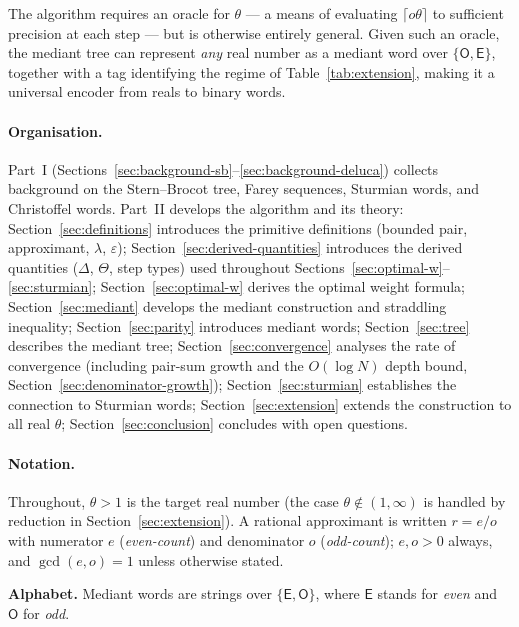 \documentclass[12pt]{article}
\theoremstyle{definition}
\theoremstyle{remark}
\theoremstyle{plain}
\newcommand{\OO}{\mathsf{O}}
\newcommand{\EE}{\mathsf{E}}
\begin{document}
The algorithm requires an oracle for $\theta$ --- a means of evaluating
$\lceil o\theta \rceil$ to sufficient precision at each step --- but is otherwise entirely
general.
Given such an oracle, the mediant tree can represent \emph{any} real number as a mediant
word over $\{\OO, \EE\}$, together with a tag identifying the regime of
Table~\ref{tab:extension}, making it a universal encoder from reals to binary words.

\paragraph{Organisation.}
Part~I (Sections~\ref{sec:background-sb}--\ref{sec:background-deluca}) collects
background on the Stern--Brocot tree, Farey sequences, Sturmian words, and Christoffel
words.
Part~II develops the algorithm and its theory:
Section~\ref{sec:definitions} introduces the primitive definitions (bounded pair,
approximant, $\lambda$, $\varepsilon$);
Section~\ref{sec:derived-quantities} introduces the derived quantities ($\Delta$,
$\Theta$, step types) used throughout Sections~\ref{sec:optimal-w}--\ref{sec:sturmian};
Section~\ref{sec:optimal-w} derives the optimal weight formula;
Section~\ref{sec:mediant} develops the mediant construction and straddling inequality;
Section~\ref{sec:parity} introduces mediant words;
Section~\ref{sec:tree} describes the mediant tree;
Section~\ref{sec:convergence} analyses the rate of convergence (including pair-sum growth and the $O(\log N)$ depth bound, Section~\ref{sec:denominator-growth});
Section~\ref{sec:sturmian} establishes the connection to Sturmian words;
Section~\ref{sec:extension} extends the construction to all real $\theta$;
Section~\ref{sec:conclusion} concludes with open questions.

\paragraph{Notation.}
Throughout, $\theta > 1$ is the target real number (the case $\theta \notin (1,\infty)$
is handled by reduction in Section~\ref{sec:extension}).
A rational approximant is written $r = e/o$ with numerator $e$ (\emph{even-count})
and denominator $o$ (\emph{odd-count}); $e, o > 0$ always, and $\gcd(e, o) = 1$
unless otherwise stated.

\textbf{Alphabet.}
Mediant words are strings over $\{\EE, \OO\}$, where $\EE$ stands for
\emph{even} and $\OO$ for \emph{odd}.
\end{document}
